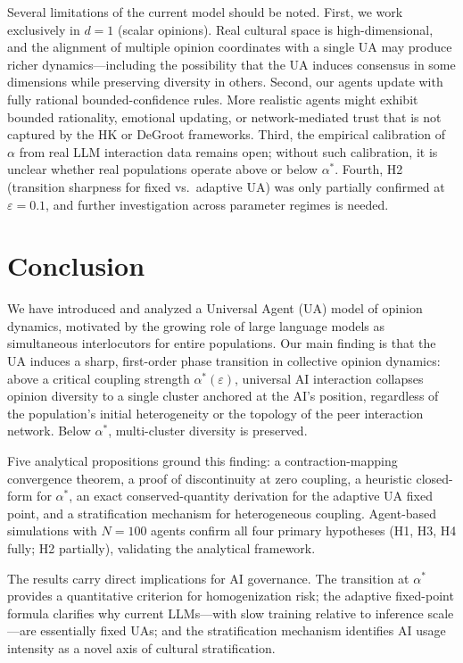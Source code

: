 \documentclass{article}
\theoremstyle{plain}
\theoremstyle{definition}
\theoremstyle{remark}
\begin{document}
Several limitations of the current model should be noted.
First, we work exclusively in $d=1$ (scalar opinions).
Real cultural space is high-dimensional, and the alignment of multiple
opinion coordinates with a single UA may produce richer dynamics---including
the possibility that the UA induces consensus in some dimensions while
preserving diversity in others.
Second, our agents update with fully rational bounded-confidence rules.
More realistic agents might exhibit bounded rationality, emotional
updating, or network-mediated trust that is not captured by the HK or
DeGroot frameworks.
Third, the empirical calibration of~$\alpha$ from real LLM interaction
data remains open; without such calibration, it is unclear whether real
populations operate above or below $\alpha^*$.
Fourth, H2 (transition sharpness for fixed vs.\ adaptive UA) was only
partially confirmed at $\varepsilon=0.1$, and further investigation
across parameter regimes is needed.

\section{Conclusion}
\label{sec:conclusion}

We have introduced and analyzed a Universal Agent (UA) model of opinion
dynamics, motivated by the growing role of large language models as
simultaneous interlocutors for entire populations.
Our main finding is that the UA induces a sharp, first-order phase
transition in collective opinion dynamics: above a critical coupling
strength $\alpha^*(\varepsilon)$, universal AI interaction collapses
opinion diversity to a single cluster anchored at the AI's position,
regardless of the population's initial heterogeneity or the topology of
the peer interaction network.
Below $\alpha^*$, multi-cluster diversity is preserved.

Five analytical propositions ground this finding: a contraction-mapping
convergence theorem, a proof of discontinuity at zero coupling, a
heuristic closed-form for $\alpha^*$, an exact conserved-quantity derivation
for the adaptive UA fixed point, and a stratification mechanism for
heterogeneous coupling.
Agent-based simulations with $N=100$ agents confirm all four primary
hypotheses (H1, H3, H4 fully; H2 partially), validating the analytical
framework.

The results carry direct implications for AI governance.
The transition at $\alpha^*$ provides a quantitative criterion for
homogenization risk; the adaptive fixed-point formula clarifies why
current LLMs---with slow training relative to inference scale---are
essentially fixed UAs; and the stratification mechanism identifies AI
usage intensity as a novel axis of cultural stratification.
\end{document}
